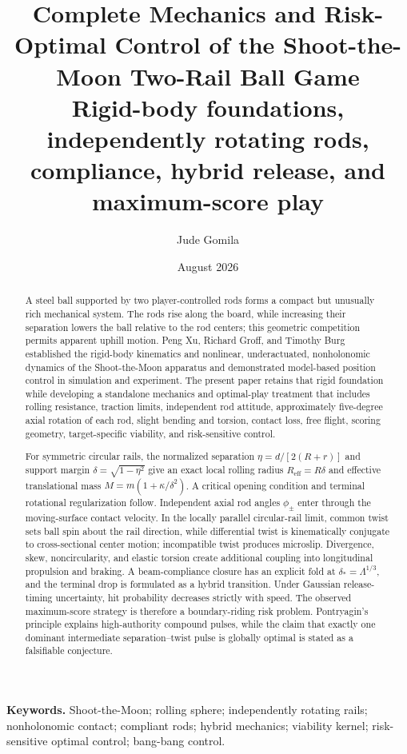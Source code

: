 \documentclass[11pt]{article}
\title{\textbf{Complete Mechanics and Risk-Optimal Control of the Shoot-the-Moon Two-Rail Ball Game}\\[0.35em]
\large Rigid-body foundations, independently rotating rods, compliance, hybrid release, and maximum-score play}
\author{Jude Gomila}
\date{August 2026}
\numberwithin{equation}{section}
\theoremstyle{definition}
\theoremstyle{remark}
\begin{document}
\maketitle

\begin{abstract}
A steel ball supported by two player-controlled rods forms a compact but unusually rich mechanical system.  The rods rise along the board, while increasing their separation lowers the ball relative to the rod centers; this geometric competition permits apparent uphill motion.  Peng Xu, Richard Groff, and Timothy Burg established the rigid-body kinematics and nonlinear, underactuated, nonholonomic dynamics of the Shoot-the-Moon apparatus and demonstrated model-based position control in simulation and experiment.  The present paper retains that rigid foundation while developing a standalone mechanics and optimal-play treatment that includes rolling resistance, traction limits, independent rod attitude, approximately five-degree axial rotation of each rod, slight bending and torsion, contact loss, free flight, scoring geometry, target-specific viability, and risk-sensitive control.

For symmetric circular rails, the normalized separation $\eta=d/[2(R+r)]$ and support margin $\delta=\sqrt{1-\eta^2}$ give an exact local rolling radius $R_{\mathrm{eff}}=R\delta$ and effective translational mass $M=m(1+\kappa/\delta^2)$.  A critical opening condition and terminal rotational regularization follow.  Independent axial rod angles $\phi_\pm$ enter through the moving-surface contact velocity.  In the locally parallel circular-rail limit, common twist sets ball spin about the rail direction, while differential twist is kinematically conjugate to cross-sectional center motion; incompatible twist produces microslip.  Divergence, skew, noncircularity, and elastic torsion create additional coupling into longitudinal propulsion and braking.  A beam-compliance closure has an explicit fold at $\delta_*=\Lambda^{1/3}$, and the terminal drop is formulated as a hybrid transition.  Under Gaussian release-timing uncertainty, hit probability decreases strictly with speed.  The observed maximum-score strategy is therefore a boundary-riding risk problem.  Pontryagin's principle explains high-authority compound pulses, while the claim that exactly one dominant intermediate separation--twist pulse is globally optimal is stated as a falsifiable conjecture.
\end{abstract}

\noindent\textbf{Keywords.} Shoot-the-Moon; rolling sphere; independently rotating rails; nonholonomic contact; compliant rods; hybrid mechanics; viability kernel; risk-sensitive optimal control; bang-bang control.
\end{document}
